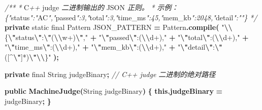 \documentclass[
  11pt,
]{ctexart}
\newenvironment{Shaded}{\begin{snugshade}}{\end{snugshade}}
\newcommand{\BuiltInTok}[1]{#1}
\newcommand{\CommentTok}[1]{\textcolor[rgb]{0.56,0.35,0.01}{\textit{#1}}}
\newcommand{\DataTypeTok}[1]{\textcolor[rgb]{0.13,0.29,0.53}{#1}}
\newcommand{\FunctionTok}[1]{\textcolor[rgb]{0.13,0.29,0.53}{\textbf{#1}}}
\newcommand{\KeywordTok}[1]{\textcolor[rgb]{0.13,0.29,0.53}{\textbf{#1}}}
\newcommand{\NormalTok}[1]{#1}
\newcommand{\OperatorTok}[1]{\textcolor[rgb]{0.81,0.36,0.00}{\textbf{#1}}}
\newcommand{\SpecialCharTok}[1]{\textcolor[rgb]{0.81,0.36,0.00}{\textbf{#1}}}
\newcommand{\StringTok}[1]{\textcolor[rgb]{0.31,0.60,0.02}{#1}}
\begin{document}
\begin{Shaded}
\begin{Highlighting}[]
    \CommentTok{/**}
     \CommentTok{*}\NormalTok{ C}\CommentTok{++}\NormalTok{ judge }\CommentTok{二进制输出的}\NormalTok{ JSON }\CommentTok{正则。}
     \CommentTok{*} \CommentTok{示例：\{"}\NormalTok{status}\CommentTok{":"}\NormalTok{AC}\CommentTok{","}\NormalTok{passed}\CommentTok{":3,"}\NormalTok{total}\CommentTok{":3,"}\NormalTok{time\_ms}\CommentTok{":45,"}\NormalTok{mem\_kb}\CommentTok{":2048,"}\NormalTok{detail}\CommentTok{":""\}}
     \CommentTok{*/}
    \KeywordTok{private} \DataTypeTok{static} \DataTypeTok{final} \BuiltInTok{Pattern}\NormalTok{ JSON\_PATTERN }\OperatorTok{=} \BuiltInTok{Pattern}\OperatorTok{.}\FunctionTok{compile}\OperatorTok{(}
        \StringTok{"}\SpecialCharTok{\textbackslash{}\textbackslash{}}\StringTok{\{}\SpecialCharTok{\textbackslash{}"}\StringTok{status}\SpecialCharTok{\textbackslash{}"}\StringTok{:}\SpecialCharTok{\textbackslash{}"}\StringTok{(}\SpecialCharTok{\textbackslash{}\textbackslash{}}\StringTok{w+)}\SpecialCharTok{\textbackslash{}"}\StringTok{,"} \OperatorTok{+}
        \StringTok{"}\SpecialCharTok{\textbackslash{}"}\StringTok{passed}\SpecialCharTok{\textbackslash{}"}\StringTok{:(}\SpecialCharTok{\textbackslash{}\textbackslash{}}\StringTok{d+),"} \OperatorTok{+}
        \StringTok{"}\SpecialCharTok{\textbackslash{}"}\StringTok{total}\SpecialCharTok{\textbackslash{}"}\StringTok{:(}\SpecialCharTok{\textbackslash{}\textbackslash{}}\StringTok{d+),"} \OperatorTok{+}
        \StringTok{"}\SpecialCharTok{\textbackslash{}"}\StringTok{time\_ms}\SpecialCharTok{\textbackslash{}"}\StringTok{:(}\SpecialCharTok{\textbackslash{}\textbackslash{}}\StringTok{d+),"} \OperatorTok{+}
        \StringTok{"}\SpecialCharTok{\textbackslash{}"}\StringTok{mem\_kb}\SpecialCharTok{\textbackslash{}"}\StringTok{:(}\SpecialCharTok{\textbackslash{}\textbackslash{}}\StringTok{d+),"} \OperatorTok{+}
        \StringTok{"}\SpecialCharTok{\textbackslash{}"}\StringTok{detail}\SpecialCharTok{\textbackslash{}"}\StringTok{:}\SpecialCharTok{\textbackslash{}"}\StringTok{([\^{}}\SpecialCharTok{\textbackslash{}"}\StringTok{]*)}\SpecialCharTok{\textbackslash{}"\textbackslash{}\textbackslash{}}\StringTok{\}"}
    \OperatorTok{);}

    \KeywordTok{private} \DataTypeTok{final} \BuiltInTok{String}\NormalTok{ judgeBinary}\OperatorTok{;}  \CommentTok{// C++ judge 二进制的绝对路径}

    \KeywordTok{public} \FunctionTok{MachineJudge}\OperatorTok{(}\BuiltInTok{String}\NormalTok{ judgeBinary}\OperatorTok{)} \OperatorTok{\{}
        \KeywordTok{this}\OperatorTok{.}\FunctionTok{judgeBinary} \OperatorTok{=}\NormalTok{ judgeBinary}\OperatorTok{;}
    \OperatorTok{\}}


\end{Highlighting}
\end{Shaded}
\end{document}
